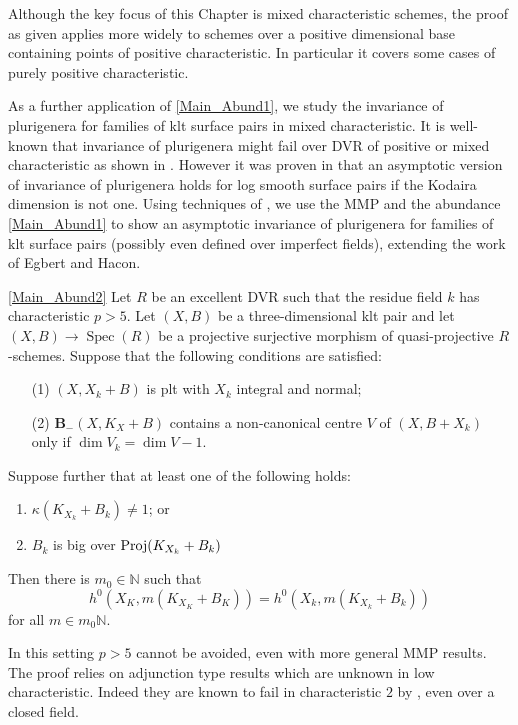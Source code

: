 \documentclass[a4paper,12pt]{book}
\DeclareMathOperator{\Spec}{Spec}
\begin{document}
	Although the key focus of this Chapter is mixed characteristic schemes, the proof as given applies more widely to schemes over a positive dimensional base containing points of positive characteristic. In particular it covers some cases of purely positive characteristic.
	
	As a further application of \autoref{Main_Abund1}, we study the invariance of plurigenera for families of klt surface pairs in mixed characteristic.
	It is well-known that invariance of plurigenera might fail over DVR of positive or mixed characteristic as shown in \cite{KU, Suh08, Bri20}.
	However it was proven in \cite{EH} that an asymptotic version of invariance of plurigenera holds for log smooth surface pairs if the Kodaira dimension is not one.
	Using techniques of \cite{HMX18}, we use the MMP and the abundance \autoref{Main_Abund1} to show an asymptotic invariance of plurigenera for families of klt surface pairs (possibly even defined over imperfect fields), extending the work of Egbert and Hacon.
	
	\begin{theo}\autoref{Main_Abund2}
		Let $R$ be an excellent DVR such that the residue field $k$ has characteristic $p>5$.
		Let $(X,B)$ be a three-dimensional klt pair and let $(X,B)\to \Spec(R)$ be a projective surjective morphism of quasi-projective $R$-schemes.  Suppose that the following conditions are satisfied:
		
		\begin{enumerate}
			\item[(1)] $(X,X_{k}+B)$ is plt with $X_k$ integral and normal;
			\item[(2)] ${\mathbf{B}_{-}(X, K_{X}+B)}$ contains a non-canonical centre $V$ of $(X,B+X_{k})$ only if $\dim V_{k}=\dim V -1$.
		\end{enumerate}
		Suppose further that at least one of the following holds:
		\begin{enumerate}
			\item $\kappa(K_{X_{k}}+B_{k}) \neq 1$; or
			\item $B_{k}$ is big over $\textup{Proj}(K_{X_{k}}+B_{k})$
		\end{enumerate}	
		Then there is $m_{0} \in \mathbb{N}$ such that 
		$$h^{0}(X_{K},m(K_{X_{K}}+B_{K}))=h^{0}(X_{k},m(K_{X_{k}}+B_{k}))$$
		for all $m \in m_{0}\mathbb{N}$.
		
	\end{theo}
	
	In this setting $p>5$ cannot be avoided, even with more general MMP results. The proof relies on adjunction type results which are unknown in low characteristic. Indeed they are known to fail in characteristic $2$ by \cite{cascini2019purely}, even over a closed field.
	
\end{document}
